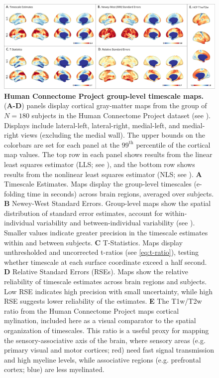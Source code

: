 \documentclass[latex/main.tex]{subfiles}
\begin{document}
\begin{figure}[H]
    \centering
    \includegraphics[width=1\textwidth]{latex/figures/fig05-hcp180.png} 
    \caption{
    \textbf{Human Connectome Project group-level timescale maps.}
    (\textbf{A-D}) panels display cortical gray-matter maps from the group of $N=180$ subjects in the Human Connectome Project dataset (see ). Displays include lateral-left, lateral-right, medial-left, and medial-right views (excluding the medial wall). The upper bounds on the colorbars are set for each panel at the $99^\text{th}$ percentile of the cortical map values. The top row in each panel shows results from the linear least squares estimator (LLS; see ), and the bottom row shows results from the nonlinear least squares estimator (NLS; see ). 
    \textbf{A} Timescale Estimates. Maps display the group-level timescales (e-folding time in seconds) across brain regions, averaged over subjects.
    \textbf{B} Newey-West Standard Errors. Group-level maps show the spatial distribution of standard error estimates, account for within-individual variability and between-individual variability (see ). Smaller values indicate greater precision in the timescale estimates within and between subjects.
    \textbf{C} T-Statistics. Maps display unthresholded and uncorrected t-ratios (see \eqref{eq:t-ratio}), testing whether timescale at each surface coordinate exceed a half second.
    \textbf{D} Relative Standard Errors (RSEs). Maps show the relative reliability of timescale estimates across brain regions and subjects. Low RSE indicates high precision with small uncertainty, while high RSE suggests lower reliability of the estimates.
    \textbf{E} The T1w/T2w ratio from the Human Connectome Project maps cortical mylination, included here as a visual comparator to the spatial organization of timescales. This ratio is a useful proxy for mapping the sensory-associative axis of the brain, where sensory areas (e.g. primary visual and motor cortices; red) need fast signal transmission and high myeline levels, while associative regions (e.g. prefrontal cortex; blue) are less myelinated.
    }
    \label{fig:map-hcp180}
\end{figure}
\end{document}
